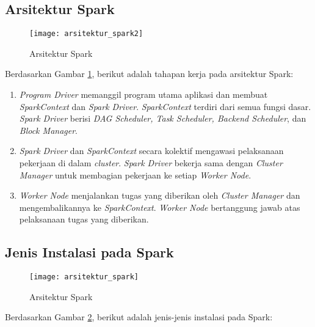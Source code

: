 \subsection{Arsitektur Spark}
\label{sec:arsitektur_spark}
\begin{figure}[H]
	\centering
	\texttt{[image: arsitektur\_spark2]}
	\caption{Arsitektur Spark}
	\label{fig:arsitektur_spark2}
\end{figure}
Berdasarkan Gambar \ref{fig:arsitektur_spark2}, berikut adalah tahapan kerja pada arsitektur Spark:

\begin{enumerate}

\item
\textit{Program Driver} memanggil program utama aplikasi dan membuat \textit{SparkContext} dan \textit{Spark Driver}. \textit{SparkContext} terdiri dari semua fungsi dasar. \textit{Spark Driver} berisi \textit{DAG Scheduler, Task Scheduler, Backend Scheduler}, dan \textit{Block Manager}.

\item
\textit{Spark Driver} dan \textit{SparkContext} secara kolektif mengawasi pelaksanaan pekerjaan di dalam \textit{cluster}. \textit{Spark Driver} bekerja sama dengan \textit{Cluster Manager} untuk membagian pekerjaan ke setiap \textit{Worker Node}. 

\item
\textit{Worker Node} menjalankan tugas yang diberikan oleh \textit{Cluster Manager} dan mengembalikannya ke \textit{SparkContext}. \textit{Worker Node} bertanggung jawab atas pelaksanaan tugas yang diberikan. 

\end{enumerate}


\subsection{Jenis Instalasi pada Spark}
\label{sec:instalasi_spark}
\begin{figure}[H]
	\centering
	\texttt{[image: arsitektur\_spark]}
	\caption{Arsitektur Spark}
	\label{fig:arsitektur_spark}
\end{figure}

Berdasarkan Gambar \ref{fig:arsitektur_spark}, berikut adalah jenis-jenis instalasi pada Spark:

